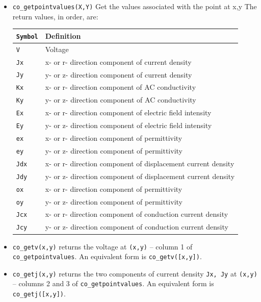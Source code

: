 \begin{itemize}
Returns a value that can be complex, as necessary.

\item \texttt{co\_getpointvalues(X,Y)} Get the values associated with the point at x,y
The return values, in order, are:

\begin{tabular}{ll}
\texttt{Symbol} &  Definition \\ \hline
\texttt{V} & Voltage \\
\texttt{Jx} & x- or r- direction component of current density \\
\texttt{Jy} & y- or z- direction component of current density \\
\texttt{Kx} & x- or r- direction component of AC conductivity \\
\texttt{Ky} & y- or z- direction component of AC conductivity \\
\texttt{Ex} & x- or r- direction component of electric field intensity \\
\texttt{Ey} & y- or z- direction component of electric field intensity \\
\texttt{ex} & x- or r- direction component of permittivity \\
\texttt{ey} & y- or z- direction component of permittivity \\
\texttt{Jdx} & x- or r- direction component of displacement current density \\
\texttt{Jdy} & y- or z- direction component of displacement current density \\
\texttt{ox} & x- or r- direction component of permittivity \\
\texttt{oy} & y- or z- direction component of permittivity \\
\texttt{Jcx} & x- or r- direction component of conduction current density \\
\texttt{Jcy} & y- or z- direction component of conduction current density \\
\end{tabular}

\item{\tt co\_getv(x,y)} returns the voltage at {\tt (x,y)} -- column 1 of {\tt co\_getpointvalues}. An equivalent form is {\tt co\_getv([x,y])}.

\item{\tt co\_getj(x,y)} returns the two components of current density {\tt Jx, Jy} at {\tt (x,y)} -- columns 2 and 3 of {\tt co\_getpointvalues}. An equivalent form is {\tt co\_getj([x,y])}.


\end{itemize}
